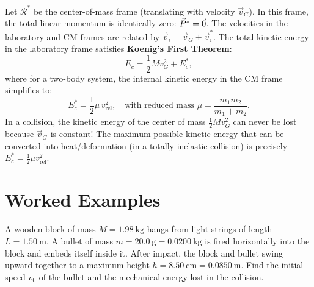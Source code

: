 Let $\mathcal{R}^*$ be the center-of-mass frame (translating with velocity $\vec{v}_G$).
In this frame, the total linear momentum is identically zero: $\vec{P}^* = \vec{0}$.
The velocities in the laboratory and CM frames are related by $\vec{v}_i = \vec{v}_G + \vec{v}_i^*$.
The total kinetic energy in the laboratory frame satisfies \textbf{Koenig's First Theorem}:
\[
\boxed{E_c = \frac{1}{2}M v_G^2 + E_c^*,}
\]
where for a two-body system, the internal kinetic energy in the CM frame simplifies to:
\[
\boxed{E_c^* = \frac{1}{2}\mu\,v_{\text{rel}}^2, \quad \text{with reduced mass } \mu = \frac{m_1 m_2}{m_1 + m_2}.}
\]
In a collision, the kinetic energy of the center of mass $\frac{1}{2}M v_G^2$ can never be lost because $\vec{v}_G$ is constant!
The maximum possible kinetic energy that can be converted into heat/deformation (in a totally inelastic collision) is precisely $E_c^* = \frac{1}{2}\mu v_{\text{rel}}^2$.

\section{Worked Examples}

\begin{worked}
A wooden block of mass $M = 1.98\ \mathrm{kg}$ hangs from light strings of length $L = 1.50\ \mathrm{m}$. A bullet of mass $m = 20.0\ \mathrm{g} = 0.0200\ \mathrm{kg}$ is fired horizontally into the block and embeds itself inside it. After impact, the block and bullet swing upward together to a maximum height $h = 8.50\ \mathrm{cm} = 0.0850\ \mathrm{m}$.
Find the initial speed $v_0$ of the bullet and the mechanical energy lost in the collision.
\end{worked}


